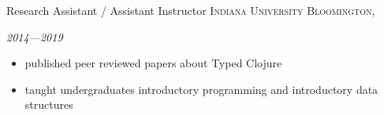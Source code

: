\documentclass[10pt,a4paper]{article}
\begin{document}
%
%




\headedsection
  {{Research Assistant / Assistant Instructor}}
  {\textsc{Indiana University Bloomington, }} {%
    {\textit{2014---2019}}
    {
    \begin{itemize}
      \item published peer reviewed papers about Typed Clojure
      \item taught undergraduates introductory programming and introductory data structures
    \end{itemize}
    }
}
\end{document}
